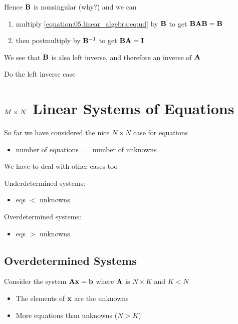 \documentclass[letterpaper,10pt,english]{jupyterBook}
\begin{document}
\sphinxAtStartPar
Hence \({\bf B}\) is nonsingular (why?) and we can
\begin{enumerate}
%
\item {} 
\sphinxAtStartPar
multiply \eqref{equation:05.linear_algebra:eq:ud} by \({\bf B}\) to get \({\bf B} {\bf A} {\bf B} = {\bf B}\)

\item {} 
\sphinxAtStartPar
then postmultiply by \({\bf B}^{-1}\) to get \({\bf B} {\bf A} = {\bf I}\)

\end{enumerate}

\sphinxAtStartPar
We see that \({\bf B}\) is also left inverse, and therefore an inverse of \({\bf A}\)

\sphinxAtStartPar
{} Do the left inverse case


\section{\protect\(M \times N\protect\) Linear Systems of Equations}
\label{\detokenize{05.linear_algebra:m-times-n-linear-systems-of-equations}}
\sphinxAtStartPar
So far we have considered the nice \(N \times N\) case for equations
\begin{itemize}
\item {} 
\sphinxAtStartPar
number of equations \(=\) number of unknowns

\end{itemize}

\sphinxAtStartPar
We have to deal with other cases too

\sphinxAtStartPar
Underdetermined systems:
\begin{itemize}
\item {} 
\sphinxAtStartPar
eqs \(<\) unknowns

\end{itemize}

\sphinxAtStartPar
Overdetermined systems:
\begin{itemize}
\item {} 
\sphinxAtStartPar
eqs \(>\) unknowns

\end{itemize}


\subsection{Overdetermined Systems}
\label{\detokenize{05.linear_algebra:overdetermined-systems}}
\sphinxAtStartPar
Consider the system \({\bf A} {\bf x} = {\bf b}\) where \({\bf A}\) is \(N \times K\) and \(K < N\)
\begin{itemize}
\item {} 
\sphinxAtStartPar
The elements of \({\bf x}\) are the unknowns

\item {} 
\sphinxAtStartPar
More equations than unknowns (\(N > K\))

\end{itemize}
\end{document}
